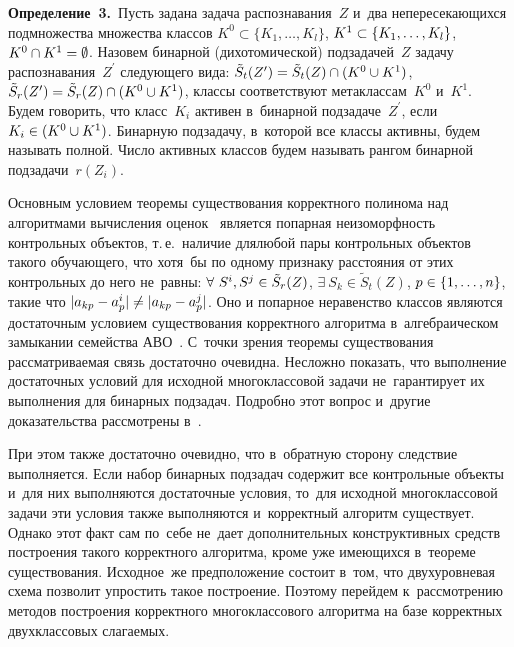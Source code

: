 \begin{multicols}{2}
\smallskip

\noindent
\textbf{Определение~3.}\
Пусть задана задача распознавания~$Z$ и~два непересекающихся подмножества 
множества классов $K^0\subset\{K_1,\ldots,K_l\}$, $K^1\hm\subset\{K_1,\ldots,K_l\}$, 
$K^0\cap K^1\hm=\emptyset$.
Назовем бинарной (дихотомической) подзадачей~$Z$ задачу распознавания~$Z^\prime$ 
следующего вида: $\tilde{S}_t(Z^\prime)\hm=\tilde{S}_t(Z)\cap (K^0\cup K^1)$,
 $\tilde{S}_r(Z^\prime)\hm=\tilde{S}_r(Z)\cap (K^0\cup K^1)$, классы соответствуют 
 метаклассам~$K^0$ и~$K^1$.
Будем говорить, что класс~$K_i$ активен в~бинарной подзадаче~$Z^\prime$, 
если $K_i\hm\in (K^0\cup K^1)$.
Бинарную подзадачу, в~которой все классы активны, будем называть полной.
Число активных классов будем называть рангом бинарной подзадачи~$r(Z_i)$.

\smallskip

Основным условием теоремы существования\linebreak
 корректного полинома над алгоритмами 
вы\-чис\-ления оценок~\cite{zhur1, zhur2} является попарная неизоморфность 
контрольных объектов, т.\,е.\ наличие для\linebreak любой пары контрольных объектов
такого обуча\-юще\-го, что хотя~бы по одному признаку расстояния от 
этих контрольных до него не~равны:
$\forall\ S^i,S^j\hm\in\tilde{S}_r(Z)$, $\exists\ S_k\in\tilde{S}_t(Z)$, 
$p\hm\in\{1,\ldots,n\}$, такие что $|a_{kp}\hm-a^i_p|\hm\neq|a_{kp}\hm-a^j_p|$.
Оно и попарное неравенство классов являются достаточным условием 
существования корректного алгоритма в~алгебраическом замыкании семейства 
АВО~\cite{dokukin2001}.
С~точки зрения теоремы существования рассматриваемая связь достаточно очевидна.
Несложно показать, что выполнение достаточных условий для исходной 
многоклассовой задачи не~гарантирует их выполнения для бинарных подзадач.
Подробно этот вопрос и~другие доказательства рассмотрены в~\cite{patrec}.

При этом также достаточно очевидно, что в~обратную сторону следствие выполняется.
Если набор бинарных подзадач содержит все контрольные объекты 
и~для них выполняются достаточные условия, то~для исходной многоклассовой 
задачи эти условия также выполняются и~корректный алгоритм существует.
Однако этот факт сам по~себе не~дает дополнительных конструктивных 
средств построения такого корректного алгоритма, кроме уже имеющихся 
в~теореме существования.
Исходное~же предположение состоит в~том, что двухуровневая схема позволит 
упростить такое построение.
Поэтому перейдем к~рассмотрению методов построения корректного 
многоклассового алгоритма на базе корректных двухклассовых слагаемых.


\end{multicols}
